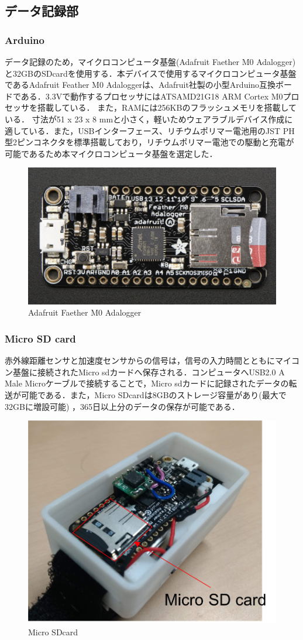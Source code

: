\subsection*{データ記録部}
\subsubsection*{Arduino}
データ記録のため，マイクロコンピュータ基盤(Adafruit Faether M0 Adalogger)\cite{Utc2018}と32GBのSDcardを使用する．本デバイスで使用するマイクロコンピュータ基盤であるAdafruit Feather M0 Adaloggerは、Adafruit社製の小型Arduino互換ボードである．3.3Vで動作するプロセッサにはATSAMD21G18 ARM Cortex M0プロセッサを搭載している．
また，RAMには256KBのフラッシュメモリを搭載している．
寸法が51 x 23 x 8 mmと小さく，軽いためウェアラブルデバイス作成に適している．また，USBインターフェース、リチウムポリマー電池用のJST PH型2ピンコネクタを標準搭載しており，リチウムポリマー電池での駆動と充電が可能であるため本マイクロコンピュータ基盤を選定した．

\begin{figure}[H]
  \centering
  \includegraphics[width=0.5\linewidth]{fig/adafruit}
  \caption{Adafruit Faether M0 Adalogger\cite{Utc2018}}
  \label{fig:adafruit}
\end{figure}

\subsubsection*{Micro SD card}
赤外線距離センサと加速度センサからの信号は，信号の入力時間とともにマイコン基盤に接続されたMicro sdカードへ保存される．コンピュータへUSB2.0 A Male Microケーブルで接続することで，Micro sdカードに記録されたデータの転送が可能である．また，Micro SDcardは8GBのストレージ容量があり(最大で32GBに増設可能)
，365日以上分のデータの保存が可能である．


\begin{figure}[H]
  \centering
  \includegraphics[width=0.5\linewidth]{fig/microsdcard}
  \caption{Micro SDcard}
  \label{fig:sd card}
\end{figure}


